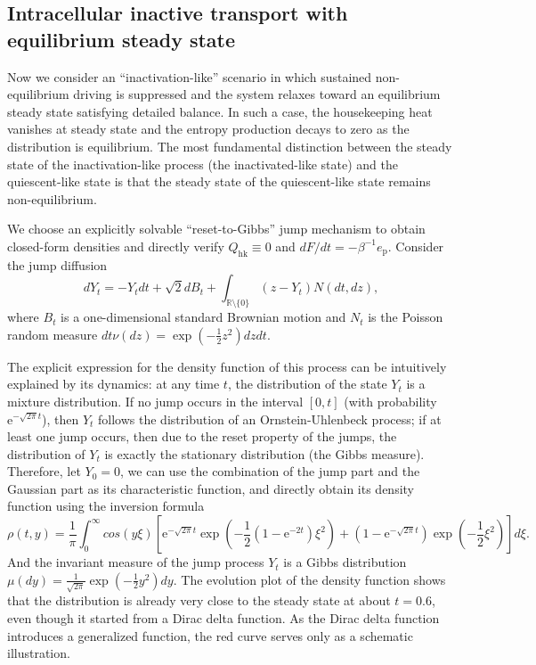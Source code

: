 \documentclass[10pt]{article}
\theoremstyle{definition}
\numberwithin{equation}{section}
\begin{document}
\subsection{Intracellular inactive transport with equilibrium steady state}


Now we consider an ``inactivation-like'' scenario in which sustained non-equilibrium driving is suppressed and the system relaxes toward an equilibrium steady state satisfying detailed balance. 
In such a case, the housekeeping heat vanishes at steady state and the entropy production decays to zero as the distribution is equilibrium.
The most fundamental distinction between the steady state of the inactivation-like process (the inactivated-like state) and the quiescent-like state is that the steady state of the quiescent-like state remains non-equilibrium.

We choose an explicitly solvable ``reset-to-Gibbs'' jump mechanism to obtain closed-form densities and directly verify $Q_\mathrm{hk}\equiv 0$ and $dF/dt=-\beta^{-1}e_\mathrm{p}$. 
Consider the jump diffusion
\begin{equation}\label{EXSDE2}
    dY_t = -Y_tdt + \sqrt{2}dB_t + \int_{\mathbb{R} \setminus \{0\}}(z-Y_t) N(dt,dz),
\end{equation}
where $B_t$ is a one-dimensional standard Brownian motion and $N_t$ is the Poisson random measure $dt\nu(dz) = \exp(-\frac{1}{2}z^2)dzdt$. 

The explicit expression for the density function of this process can be intuitively explained by its dynamics: at any time $t$, the distribution of the state $Y_t$ is a mixture distribution. If no jump occurs in the interval $[0, t]$ (with probability $\mathrm{e}^{-\sqrt{2\pi}t}$), then $Y_t$ follows the distribution of an Ornstein-Uhlenbeck process; if at least one jump occurs, then due to the reset property of the jumps, the distribution of $Y_t$ is exactly the stationary distribution (the Gibbs measure). Therefore, let $Y_0=0$, we can use the combination of the jump part and the Gaussian part as its characteristic function, and directly obtain its density function using the inversion formula
\begin{equation*}
    \rho(t,y) = \frac{1}{\pi}\int_0^\infty cos(y\xi)\left[ \mathrm{e}^{-\sqrt{2\pi}t}\exp\left( -\frac{1}{2}(1-\mathrm{e}^{-2t})\xi^2 \right) + (1 - \mathrm{e}^{-\sqrt{2\pi}t})\exp\left( -\frac{1}{2}\xi^2 \right) \right] d\xi.
\end{equation*}
And the invariant measure of the jump process $Y_t$ is a Gibbs distribution $\mu(dy) = \frac{1}{\sqrt{2\pi}}\exp(-\frac{1}{2}y^2)dy$. The evolution plot of the density function  shows that the distribution is already very close to the steady state at about $t=0.6$, even though it started from a Dirac delta function. As the Dirac delta function introduces a generalized function, the red curve serves only as a schematic illustration.
\end{document}
